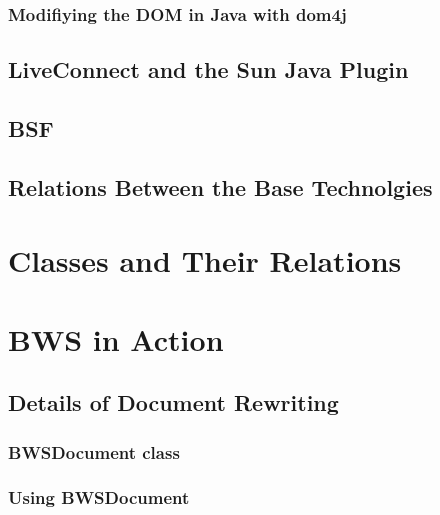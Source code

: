    \subsubsection{Modifiying the DOM in Java with dom4j}
   
    
    
  \subsection{LiveConnect and the Sun Java Plugin}
  
   
   
  \subsection{BSF}
  
   
  
  \subsection{Relations Between the Base Technolgies}
   
   
   
 \section{Classes and Their Relations}
 
  
   
 \section{BWS in Action}
  
  
  
  \subsection{Details of Document Rewriting}
  
   

   \subsubsection{BWSDocument class}
   \label{sec:docRewritting}
     
    
     
   \subsubsection{Using BWSDocument}
